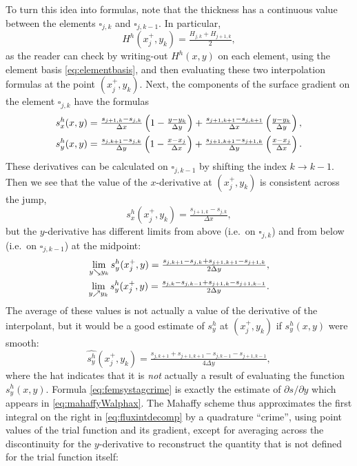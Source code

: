 \documentclass[11pt]{amsart}
\begin{document}
To turn this idea into formulas, note that the thickness has a continuous value between the elements $\square_{j,k}$ and $\square_{j,k-1}$.  In particular,
\begin{equation}
H^h(x_j^+,y_k) = \tfrac{H_{j,k}+H_{j+1,k}}{2}, \label{eq:femHstag}
\end{equation}
as the reader can check by writing-out $H^h(x,y)$ on each element, using the element basis \eqref{eq:elementbasis}, and then evaluating these two interpolation formulas at the point $(x_j^+,y_k)$.  Next, the components of the surface gradient on the element $\square_{j,k}$ have the formulas
\begin{align}
s^h_x(x,y) &= \tfrac{s_{j+1,k}-s_{j,k}}{\Delta x} \left(1-\tfrac{y-y_k}{\Delta y}\right) + \tfrac{s_{j+1,k+1}-s_{j,k+1}}{\Delta x} \left(\tfrac{y-y_k}{\Delta y}\right), \label{eq:grads} \\
s^h_y(x,y) &= \tfrac{s_{j,k+1}-s_{j,k}}{\Delta y} \left(1-\tfrac{x-x_j}{\Delta x}\right) + \tfrac{s_{j+1,k+1}-s_{j+1,k}}{\Delta y} \left(\tfrac{x-x_j}{\Delta x}\right). \notag
\end{align}
These derivatives can be calculated on $\square_{j,k-1}$ by shifting the index $k\to k-1$.  Then we see that the value of the $x$-derivative at $(x_j^+,y_k)$ is consistent across the jump,
\begin{equation}
s^h_x(x_j^+,y_k) = \tfrac{s_{j+1,k}-s_{j,k}}{\Delta x}, \label{eq:femsxstag}
\end{equation}
but the $y$-derivative has different limits from above (i.e.~on $\square_{j,k}$) and from below (i.e.~on $\square_{j,k-1}$) at the midpoint:
\begin{align}
\lim_{y\searrow y_k} s^h_y(x_j^+,y) = \tfrac{s_{j,k+1}-s_{j,k} + s_{j+1,k+1}-s_{j+1,k}}{2\Delta y}, \\
\lim_{y\nearrow y_k} s^h_y(x_j^+,y) = \tfrac{s_{j,k}-s_{j,k-1} + s_{j+1,k}-s_{j+1,k-1}}{2\Delta y}. \notag
\end{align}
The average of these values is not actually a value of the derivative of the interpolant, but it would be a good estimate of $s^h_y$ at $(x_j^+,y_k)$ if $s^h_y(x,y)$ were smooth:
\begin{equation}
\widehat{s^h_y}(x_j^+,y_k) = \tfrac{s_{j,k+1} + s_{j+1,k+1} - s_{j,k-1} - s_{j+1,k-1}}{4\Delta y}, \label{eq:femsystagcrime}
\end{equation}
where the hat indicates that it is \emph{not} actually a result of evaluating the function $s^h_y(x,y)$.  Formula \eqref{eq:femsystagcrime} is exactly the estimate of $\partial s/\partial y$ which appears in \eqref{eq:mahaffyWalphax}.  The Mahaffy scheme thus approximates the first integral on the right in \eqref{eq:fluxintdecomp} by a quadrature ``crime'', using point values of the trial function and its gradient, except for averaging across the discontinuity for the $y$-derivative to reconstruct the quantity that is not defined for the trial function itself:
\end{document}
